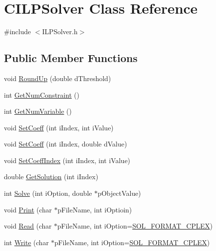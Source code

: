 \hypertarget{classCILPSolver}{}\section{C\+I\+L\+P\+Solver Class Reference}
\label{classCILPSolver}


{\ttfamily \#include $<$I\+L\+P\+Solver.\+h$>$}

\subsection*{Public Member Functions}
\begin{DoxyCompactItemize}
\item 
void \mbox{\hyperlink{classCILPSolver_a3551534866ccdc50262d2294157dae84}{Round\+Up}} (double d\+Threshold)
\item 
int \mbox{\hyperlink{classCILPSolver_a17d4b786fa8f12b2dc51e8d53d75fc4b}{Get\+Num\+Constraint}} ()
\item 
int \mbox{\hyperlink{classCILPSolver_a3a49add202ea4a77052dad9527c2d7cb}{Get\+Num\+Variable}} ()
\item 
void \mbox{\hyperlink{classCILPSolver_a028cb4889ef3dce3535ba3a5db62aaf4}{Set\+Coeff}} (int i\+Index, int i\+Value)
\item 
void \mbox{\hyperlink{classCILPSolver_ace812eaf28da94b99150bfd3f76f9e25}{Set\+Coeff}} (int i\+Index, double d\+Value)
\item 
void \mbox{\hyperlink{classCILPSolver_a546c06e42c5a767dd6d0c7ff03232f32}{Set\+Coeff\+Index}} (int i\+Index, int i\+Value)
\item 
double \mbox{\hyperlink{classCILPSolver_a29b0d08d626ff554d4d21911f3da0583}{Get\+Solution}} (int i\+Index)
\item 
int \mbox{\hyperlink{classCILPSolver_a1de0df19fea8757e39642457f35fb693}{Solve}} (int i\+Option, double $\ast$p\+Object\+Value)
\item 
void \mbox{\hyperlink{classCILPSolver_ac1ebb76c21b3ccaf3b12eca39cab42a6}{Print}} (char $\ast$p\+File\+Name, int i\+Optioin)
\item 
void \mbox{\hyperlink{classCILPSolver_a4dd20e9187f4fb9934bd13535941b9a1}{Read}} (char $\ast$p\+File\+Name, int i\+Option=\mbox{\hyperlink{ILPSolver_8h_acee7a96f3deaccde51231b3aa7c8bcb2}{S\+O\+L\+\_\+\+F\+O\+R\+M\+A\+T\+\_\+\+C\+P\+L\+EX}})
\item 
int \mbox{\hyperlink{classCILPSolver_a47313561701dd5a8a0588ed8ecca2ad0}{Write}} (char $\ast$p\+File\+Name, int i\+Option=\mbox{\hyperlink{ILPSolver_8h_acee7a96f3deaccde51231b3aa7c8bcb2}{S\+O\+L\+\_\+\+F\+O\+R\+M\+A\+T\+\_\+\+C\+P\+L\+EX}})

\end{DoxyCompactItemize}
